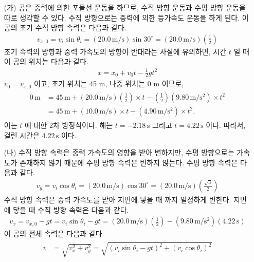 \documentclass[floatfix,nofootinbib,superscriptaddress,fleqn,preprint]{revtex4}
\begin{document}
\begin{itemize}
  \item[(가)]공은 중력에 의한 포물선 운동을 하므로, 수직 방향 운동과
  수평 방향 운동을 따로 생각할 수 있다. 수직 방향으로는 중력에 의한 등가속도 운동을 하게 된다.
  이 공의 초기 수직 방향 속력은 다음과 같다.
  \begin{align}
    v_{x,0}=v_i\sin{\theta_i}=(20.0\,\mathrm{m/s})\sin{30^\circ}
    =(20.0\,\mathrm{m/s})\left(\frac{1}{2}\right)
  \end{align}
  초기 속력의 방향과 중력 가속도의 방향이 반대라는 사실에 유의하면, 
  시간 $t$ 일 때 이 공의 위치는 다음과 같다.
  \begin{align}
    x=x_0+v_0t-\frac{1}{2}gt^2
  \end{align}
  $v_0=v_{x,0}$ 이고, 초기 위치는 45 m, 나중 위치는 0 m 이므로,
  \begin{align}
    \begin{split} 
      0\,\mathrm{m}&=45\,\mathrm{m}+(20.0\,\mathrm{m/s})
      \left(\frac{1}{2}\right)\times t
      -\left(\frac{1}{2}\right)
      (9.80\,\mathrm{m/s^2})\times t^2 \\
      &=45\,\mathrm{m}+(10.0\,\mathrm{m/s})\times t
      -(4.90\,\mathrm{m/s^2})\times t^2.
    \end{split}
  \end{align}
  이는 $t$ 에 대한 2차 방정식이다. 해는 $t=-2.18\,\mathrm{s} $ 
  그리고 $t=4.22\,\mathrm{s}$ 이다. 
  따라서, 걸린 시간은 $4.22\,\mathrm{s}$ 이다.
  \item[(나)] 수직 방향 속력은 중력 가속도의 영향을 받아 변하지만, 
  수평 방향으로는 가속도가 존재하지 않기 때문에 수평 방향 속력은 
  변하지 않는다. 수평 방향 속력은 다음과 같다.
  \begin{align}
    v_y=v_i\cos{\theta_i}=(20.0\,\mathrm{m/s})\cos{30^\circ}
    =(20.0\,\mathrm{m/s})\left(\frac{\sqrt{3}}{2}\right)
  \end{align}
  수직 방향 속력은 중력 가속도를 받아 지면에 닿을 때 까지 일정하게 변한다. 
  지면에 닿을 때 수직 방향 속력은 다음과 같다.
  \begin{align}
    v_x=v_{x,0}-gt=v_i\sin{\theta_i}-gt
    =(20.0\,\mathrm{m/s})\left(\frac{1}{2}\right)
    -(9.80\,\mathrm{m/s^2})(4.22\,\mathrm{s})
  \end{align}
  이 공의 전체 속력은 다음과 같다.
  \begin{align}
    \begin{split}
      v&=\sqrt{v_x^2+v_y^2}=\sqrt{{(v_i\sin{\theta_i}-gt)}^2+{(v_i\cos{\theta_i})}^2} \\

\end{split}
\end{align}
\end{itemize}
\end{document}
